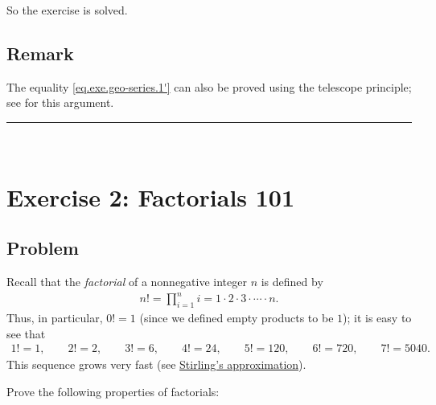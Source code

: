 \documentclass[paper=a4, fontsize=12pt]{scrartcl} %
\newcommand{\horrule}[1]{\rule{\linewidth}{#1}} %
\let\prodnonlimits\prod
\renewcommand{\prod}{\prodnonlimits\limits}
\theoremstyle{plainsl}
\theoremstyle{definition}
\theoremstyle{remark}
\begin{document}
So the exercise is solved.

\subsection{Remark}

The equality \eqref{eq.exe.geo-series.1'} can also be proved using
the telescope principle; see \cite[(18)]{detnotes} for this
argument.

\horrule{0.3pt} \\[0.4cm]

\section{Exercise 2: Factorials 101}

\subsection{Problem}

Recall that the \textit{factorial} of a nonnegative integer $n$
is defined by
\begin{align*}
n! = \prod_{i=1}^n i = 1 \cdot 2 \cdot 3 \cdot \cdots \cdot n .
\end{align*}
Thus, in particular, $0! = 1$ (since we defined empty products
to be $1$); it is easy to see that
\begin{align*}
1! = 1, \qquad
2! = 2, \qquad
3! = 6, \qquad
4! = 24, \qquad
5! = 120, \qquad
6! = 720, \qquad
7! = 5040.
\end{align*}
This sequence grows very fast (see
\href{https://en.wikipedia.org/wiki/Stirling's_approximation}{Stirling's approximation}).

Prove the following properties of factorials:
\end{document}
